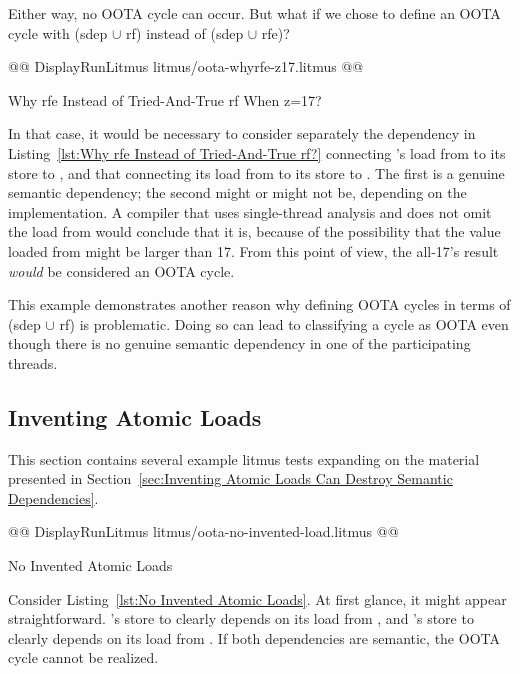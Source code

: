 \documentclass[10]{article}
\begin{document}
Either way, no OOTA cycle can occur.
But what if we chose to define an OOTA cycle with (sdep $\cup$ rf) instead
of (sdep $\cup$ rfe)?

\begin{listing}[tbp]
@@ DisplayRunLitmus litmus/oota-whyrfe-z17.litmus @@
\caption{Why rfe Instead of Tried-And-True rf When z=17?}
\label{lst:Why rfe Instead of Tried-And-True rf When z=17?}
\end{listing}

In that case, it would be necessary to consider separately the dependency
in Listing~\ref{lst:Why rfe Instead of Tried-And-True rf?}
connecting 's load from  to its store to ,
and that connecting its load from  to its store to .
The first is a genuine semantic dependency; the second might or might
not be, depending on the implementation.
A compiler that uses single-thread analysis and does not omit the load
from  would conclude that it is, because of the
possibility that the value loaded from  might be larger than 17.
From this point of view, the all-17's result \emph{would} be
considered an OOTA cycle.

This example demonstrates another reason why defining OOTA cycles
in terms of (sdep $\cup$ rf) is problematic.
Doing so can lead to classifying a cycle as OOTA even though there
is no genuine semantic dependency in one of the participating threads.

\subsection{Inventing Atomic Loads}
\label{app:Inventing Atomic Loads}

This section contains several example litmus tests
expanding on the material presented in
Section~\ref{sec:Inventing Atomic Loads Can Destroy Semantic Dependencies}.

\begin{listing}[tbp]
@@ DisplayRunLitmus litmus/oota-no-invented-load.litmus @@
\caption{No Invented Atomic Loads}
\label{lst:No Invented Atomic Loads}
\end{listing}

Consider Listing~\ref{lst:No Invented Atomic Loads}.
At first glance, it might appear straightforward.
's store to  clearly depends on its load from ,
and 's store to  clearly depends on its load from .
If both dependencies are semantic, the OOTA cycle cannot be realized.
\end{document}
